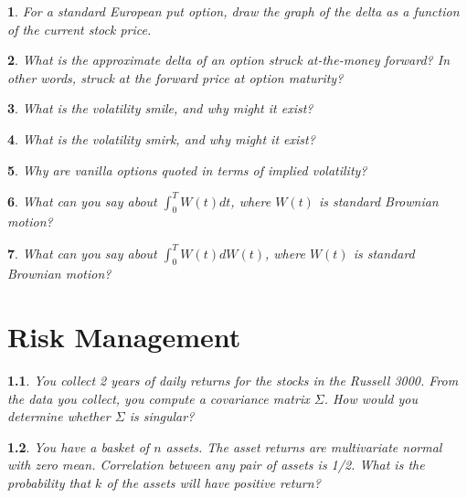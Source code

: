 \documentclass{report}
\newtheorem{problem}{}
\numberwithin{problem}{chapter} %
\begin{document}
\begin{problem}
\cite{CRACK} For a standard European put option, draw the graph of the delta as a function of the current stock price.
\end{problem}

\begin{problem}
What is the approximate delta of an option struck at-the-money forward? In other words, struck at the forward price at option maturity?
\end{problem}

\begin{problem}
What is the volatility smile, and why might it exist?
\end{problem}

\begin{problem}
What is the volatility smirk, and why might it exist?
\end{problem}

\begin{problem}
Why are vanilla options quoted in terms of implied volatility?
\end{problem}

\begin{problem}
\cite{CRACK} What can you say about $\int_0^{T} W(t)dt$, where $W(t)$ is standard Brownian motion?
\end{problem}

\begin{problem}
\cite{CRACK} What can you say about $\int_0^{T} W(t)dW(t)$, where $W(t)$ is standard Brownian motion?
\end{problem}

\chapter{Risk Management}

\begin{problem}
You collect 2 years of daily returns for the stocks in the Russell 3000. From the data you collect, you compute a covariance matrix $\Sigma$. How would you determine whether $\Sigma$ is singular?
\end{problem}

\begin{problem}
You have a basket of $n$ assets. The asset returns are multivariate normal with zero mean. Correlation between any pair of assets is 1/2. What is the probability that $k$ of the assets will have positive return?
\end{problem}
\end{document}
